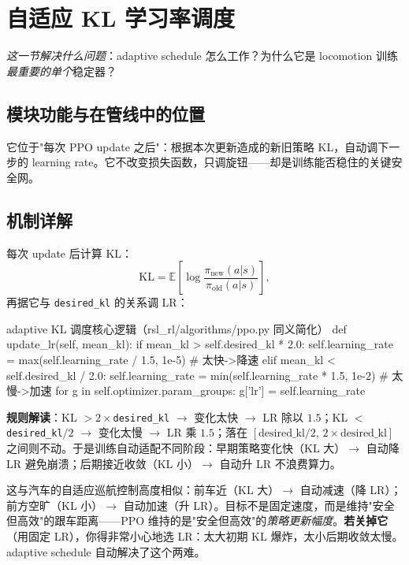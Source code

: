 \section{自适应 KL 学习率调度}
\label{sec:rlmc-train-adaptkl}

\emph{这一节解决什么问题}：adaptive schedule 怎么工作？为什么它是 locomotion 训练\emph{最重要的单个}稳定器？

\subsection{模块功能与在管线中的位置}

它位于"每次 PPO update 之后"：根据本次更新造成的新旧策略 KL，自动调下一步的 learning rate。它不改变损失函数，只调旋钮——却是训练能否稳住的关键安全网。

\subsection{机制详解}

每次 update 后计算 KL：
\begin{equation}
\mathrm{KL}=\mathbb{E}\!\left[\log\frac{\pi_{\text{new}}(a|s)}{\pi_{\text{old}}(a|s)}\right],
\label{eq:rlmc-kl}
\end{equation}
再据它与 \verb|desired_kl| 的关系调 LR：

\begin{codebox}[Python]{adaptive KL 调度核心逻辑（rsl\_rl/algorithms/ppo.py 同义简化）}
def update_lr(self, mean_kl):
    if mean_kl > self.desired_kl * 2.0:
        self.learning_rate = max(self.learning_rate / 1.5, 1e-5)   # 太快->降速
    elif mean_kl < self.desired_kl / 2.0:
        self.learning_rate = min(self.learning_rate * 1.5, 1e-2)   # 太慢->加速
    for g in self.optimizer.param_groups:
        g['lr'] = self.learning_rate
\end{codebox}

\textbf{规则解读}：KL $>2\times$\verb|desired_kl| $\to$ 变化太快 $\to$ LR 除以 $1.5$；KL $<$ \verb|desired_kl|$/2$ $\to$ 变化太慢 $\to$ LR 乘 $1.5$；落在 $[\text{desired\_kl}/2,\,2\times\text{desired\_kl}]$ 之间则不动。于是训练自动适配不同阶段：早期策略变化快（KL 大）$\to$ 自动降 LR 避免崩溃；后期接近收敛（KL 小）$\to$ 自动升 LR 不浪费算力。

\begin{insight}\label{ins:rlmc-acc}
这与汽车的自适应巡航控制高度相似：前车近（KL 大）$\to$ 自动减速（降 LR）；前方空旷（KL 小）$\to$ 自动加速（升 LR）。目标不是固定速度，而是维持"安全但高效"的跟车距离——PPO 维持的是"安全但高效"的\emph{策略更新幅度}。\textbf{若关掉它}（用固定 LR），你得非常小心地选 LR：太大初期 KL 爆炸，太小后期收敛太慢。adaptive schedule 自动解决了这个两难。
\end{insight}

